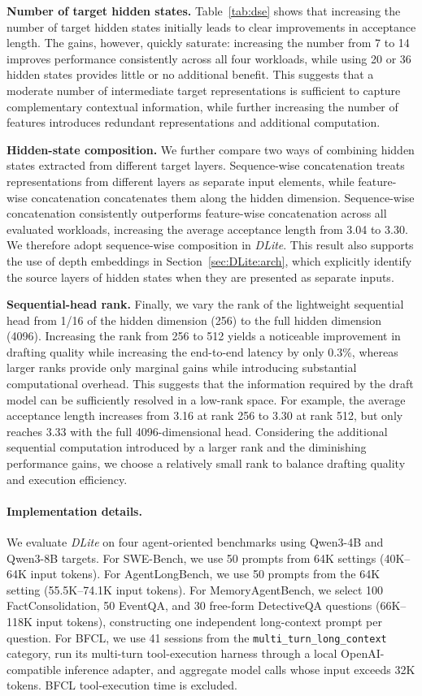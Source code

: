 \documentclass{article} %
\newcommand{\we}{\emph{DLite}\xspace}
\begin{document}
\textbf{Number of target hidden states.} Table~\ref{tab:dse} shows that increasing the number of target hidden states initially leads to clear improvements in acceptance length. The gains, however, quickly saturate: increasing the number from 7 to 14 improves performance consistently across all four workloads, while using 20 or 36 hidden states provides little or no additional benefit. This suggests that a moderate number of intermediate target representations is sufficient to capture complementary contextual information, while further increasing the number of features introduces redundant representations and additional computation.

\textbf{Hidden-state composition.} We further compare two ways of combining hidden states extracted from different target layers. Sequence-wise concatenation treats representations from different layers as separate input elements, while feature-wise concatenation concatenates them along the hidden dimension. Sequence-wise concatenation consistently outperforms feature-wise concatenation across all evaluated workloads, increasing the average acceptance length from 3.04 to 3.30. We therefore adopt sequence-wise composition in \we. This result also supports the use of depth embeddings in Section~\ref{sec:DLite:arch}, which explicitly identify the source layers of hidden states when they are presented as separate inputs.

\textbf{Sequential-head rank.} Finally, we vary the rank of the lightweight sequential head from 1/16 of the hidden dimension (256) to the full hidden dimension (4096). Increasing the rank from 256 to 512 yields a noticeable improvement in drafting quality while increasing the end-to-end latency by only 0.3\%, whereas larger ranks provide only marginal gains while introducing substantial computational overhead. This suggests that the information required by the draft model can be sufficiently resolved in a low-rank space. For example, the average acceptance length increases from 3.16 at rank 256 to 3.30 at rank 512, but only reaches 3.33 with the full 4096-dimensional head. Considering the additional sequential computation introduced by a larger rank and the diminishing performance gains, we choose a relatively small rank to balance drafting quality and execution efficiency.

\paragraph{Implementation details.}
We evaluate \we on four agent-oriented benchmarks using Qwen3-4B and Qwen3-8B targets. For SWE-Bench, we use 50 prompts from 64K settings (40K--64K input tokens). For AgentLongBench, we use 50 prompts from the 64K setting (55.5K--74.1K input tokens). For MemoryAgentBench, we select 100 FactConsolidation, 50 EventQA, and 30 free-form DetectiveQA questions (66K--118K input tokens), constructing one independent long-context prompt per question. For BFCL, we use 41 sessions from the \texttt{multi\_turn\_long\_context} category, run its multi-turn tool-execution harness through a local OpenAI-compatible inference adapter, and aggregate model calls whose input exceeds 32K tokens. BFCL tool-execution time is excluded. 
\end{document}
